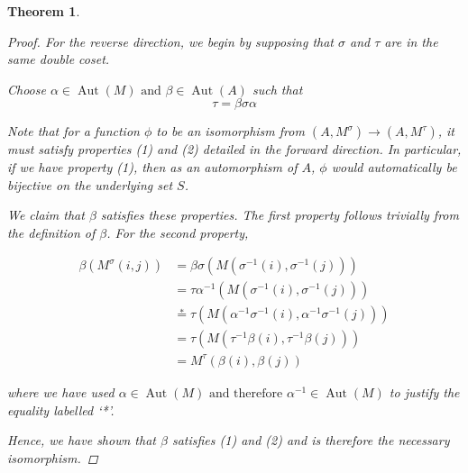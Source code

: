 \documentclass{article}
\theoremstyle{definition}
\theoremstyle{plain}
\newtheorem{theorem}[defn]{Theorem}
\begin{document}
\begin{theorem}
\begin{proof}
    \vspace{2em}
    For the reverse direction, we begin by supposing that \(\sigma\)
    and \(\tau\) are in the same double coset.

    Choose \(\alpha\in\operatorname{Aut}(M)\text{ and }
    \beta\in\operatorname{Aut}(A)\) such that
    \[\tau=\beta\sigma\alpha\]

    Note that for a function \(\phi\) to be an isomorphism from
    \((A,M^\sigma)\to(A, M^\tau)\), it must satisfy properties (1)
    and (2) detailed in the forward direction. In particular, if we
    have property (1), then as an automorphism of \(A\), \(\phi\)
    would automatically be bijective on the underlying set \(S\).

    We claim that \(\beta\) satisfies these properties. The first
    property follows trivially from the definition of \(\beta\). For
    the second property,

    \begin{align*}
      \beta(M^\sigma(i,j))&=\beta\sigma(M(\sigma^{-1}(i),\sigma^{-1}(j)))\\
      &=\tau\alpha^{-1}(M(\sigma^{-1}(i),\sigma^{-1}(j)))\\
      &\overset{*}{=}\tau(M(\alpha^{-1}\sigma^{-1}(i),\alpha^{-1}\sigma^{-1}(j)))\\
      &=\tau(M(\tau^{-1}\beta(i),\tau^{-1}\beta(j)))\\
      &=M^\tau(\beta(i),\beta(j))
    \end{align*}

    where we have used \(\alpha\in\operatorname{Aut}(M)\text{ and
    therefore }\alpha^{-1}\in\operatorname{Aut}(M)\) to justify the
    equality labelled `*'.

    Hence, we have shown that \(\beta\) satisfies (1) and (2) and is
    therefore the necessary isomorphism.
  \end{proof}
\end{theorem}
\end{document}
